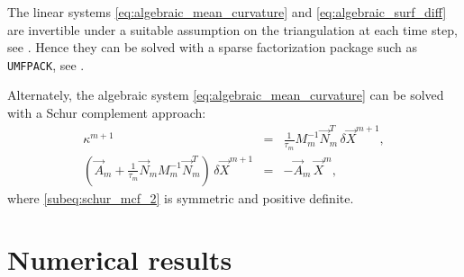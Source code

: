 The linear systems \eqref{eq:algebraic_mean_curvature} and
\eqref{eq:algebraic_surf_diff} are invertible under a suitable assumption on the
triangulation at each time step, see \cite{gflows3d}. Hence they can be solved
with a sparse factorization package such as \verb|UMFPACK|, see \cite{Davis04}.

Alternately, the algebraic system \eqref{eq:algebraic_mean_curvature} can be
solved with a Schur complement approach:
\begin{subequations}
 \begin{eqnarray}
  \kappa^{m + 1} & = & \frac{1}{\tau_m} M_m^{-1} \vec{N}^{T}_m \, \delta
  \vec{X}^{m + 1} \label{subeq:schur_mcf_1} , \\
  (\vec{A}_m + \frac{1}{\tau_m} \vec{N}_m M_m^{-1} \vec{N}^{T}_m) \, \delta
  \vec{X}^{m + 1} & = & - \vec{A}_m \, \vec{X}^{m} , \label{subeq:schur_mcf_2}
 \end{eqnarray}
\end{subequations}
where \eqref{subeq:schur_mcf_2} is symmetric and positive definite.

\section[Numerical results]{Numerical results}
